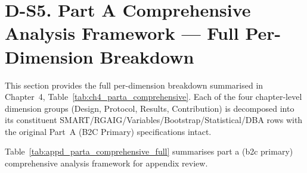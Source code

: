 \section*{D-S5. Part A Comprehensive Analysis Framework --- Full Per-Dimension Breakdown}
\label{sec:appd_parta_comprehensive_full}

\noindent This section provides the full per-dimension breakdown summarised in Chapter~4, Table~\ref{tab:ch4_parta_comprehensive}. Each of the four chapter-level dimension groups (Design, Protocol, Results, Contribution) is decomposed into its constituent SMART/RGAIG/Variables/Bootstrap/Statistical/DBA rows with the original Part~A (B2C Primary) specifications intact.

\noindent Table~\ref{tab:appd_parta_comprehensive_full} summarises part a (b2c primary) comprehensive analysis framework for appendix review.

